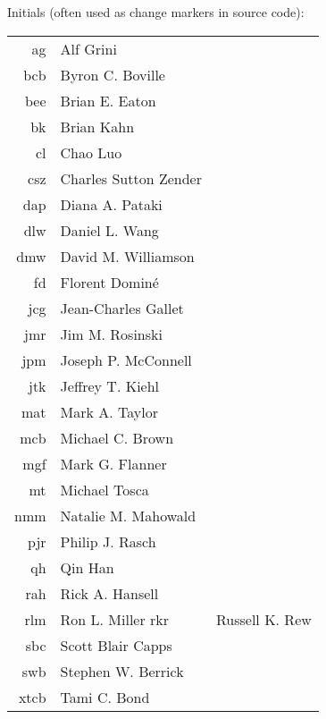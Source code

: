 \documentclass[12pt,twoside]{article}
\begin{document}
Initials (often used as change markers in source code):
\begin{longtable}[>{\bfseries}l]{>{\ttfamily}r l}
ag  & Alf Grini \\
bcb & Byron C. Boville \\
bee & Brian E. Eaton \\
bk  & Brian Kahn \\
cl  & Chao Luo \\
csz & Charles Sutton Zender \\
dap & Diana A. Pataki \\
dlw & Daniel L. Wang \\
dmw & David M. Williamson \\
fd  & Florent Domin\'{e} \\
jcg & Jean-Charles Gallet \\
jmr & Jim M. Rosinski \\
jpm & Joseph P. McConnell \\
jtk & Jeffrey T. Kiehl \\
mat & Mark A. Taylor \\
mcb & Michael C. Brown \\
mgf & Mark G. Flanner \\
mt  & Michael Tosca \\
nmm & Natalie M. Mahowald \\
pjr & Philip J. Rasch \\
qh  & Qin Han \\
rah & Rick A. Hansell \\
rlm & Ron L. Miller
rkr & Russell K. Rew \\
sbc & Scott Blair Capps \\
swb & Stephen W. Berrick \\
xtcb & Tami C. Bond \\
\end{longtable}
\end{document}
